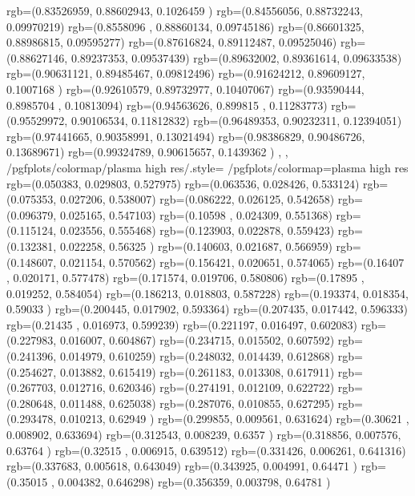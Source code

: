 {{{		  rgb=(0.83526959,  0.88602943,  0.1026459 )
		  rgb=(0.84556056,  0.88732243,  0.09970219)
		  rgb=(0.8558096 ,  0.88860134,  0.09745186)
		  rgb=(0.86601325,  0.88986815,  0.09595277)
		  rgb=(0.87616824,  0.89112487,  0.09525046)
		  rgb=(0.88627146,  0.89237353,  0.09537439)
		  rgb=(0.89632002,  0.89361614,  0.09633538)
		  rgb=(0.90631121,  0.89485467,  0.09812496)
		  rgb=(0.91624212,  0.89609127,  0.1007168 )
		  rgb=(0.92610579,  0.89732977,  0.10407067)
		  rgb=(0.93590444,  0.8985704 ,  0.10813094)
		  rgb=(0.94563626,  0.899815  ,  0.11283773)
		  rgb=(0.95529972,  0.90106534,  0.11812832)
		  rgb=(0.96489353,  0.90232311,  0.12394051)
		  rgb=(0.97441665,  0.90358991,  0.13021494)
		  rgb=(0.98386829,  0.90486726,  0.13689671)
		  rgb=(0.99324789,  0.90615657,  0.1439362 )
		},
	},
	/pgfplots/colormap/plasma high res/.style={%
		/pgfplots/colormap={plasma high res}{%
		  rgb=(0.050383,  0.029803,  0.527975)
		  rgb=(0.063536,  0.028426,  0.533124)
		  rgb=(0.075353,  0.027206,  0.538007)
		  rgb=(0.086222,  0.026125,  0.542658)
		  rgb=(0.096379,  0.025165,  0.547103)
		  rgb=(0.10598 ,  0.024309,  0.551368)
		  rgb=(0.115124,  0.023556,  0.555468)
		  rgb=(0.123903,  0.022878,  0.559423)
		  rgb=(0.132381,  0.022258,  0.56325 )
		  rgb=(0.140603,  0.021687,  0.566959)
		  rgb=(0.148607,  0.021154,  0.570562)
		  rgb=(0.156421,  0.020651,  0.574065)
		  rgb=(0.16407 ,  0.020171,  0.577478)
		  rgb=(0.171574,  0.019706,  0.580806)
		  rgb=(0.17895 ,  0.019252,  0.584054)
		  rgb=(0.186213,  0.018803,  0.587228)
		  rgb=(0.193374,  0.018354,  0.59033 )
		  rgb=(0.200445,  0.017902,  0.593364)
		  rgb=(0.207435,  0.017442,  0.596333)
		  rgb=(0.21435 ,  0.016973,  0.599239)
		  rgb=(0.221197,  0.016497,  0.602083)
		  rgb=(0.227983,  0.016007,  0.604867)
		  rgb=(0.234715,  0.015502,  0.607592)
		  rgb=(0.241396,  0.014979,  0.610259)
		  rgb=(0.248032,  0.014439,  0.612868)
		  rgb=(0.254627,  0.013882,  0.615419)
		  rgb=(0.261183,  0.013308,  0.617911)
		  rgb=(0.267703,  0.012716,  0.620346)
		  rgb=(0.274191,  0.012109,  0.622722)
		  rgb=(0.280648,  0.011488,  0.625038)
		  rgb=(0.287076,  0.010855,  0.627295)
		  rgb=(0.293478,  0.010213,  0.62949 )
		  rgb=(0.299855,  0.009561,  0.631624)
		  rgb=(0.30621 ,  0.008902,  0.633694)
		  rgb=(0.312543,  0.008239,  0.6357  )
		  rgb=(0.318856,  0.007576,  0.63764 )
		  rgb=(0.32515 ,  0.006915,  0.639512)
		  rgb=(0.331426,  0.006261,  0.641316)
		  rgb=(0.337683,  0.005618,  0.643049)
		  rgb=(0.343925,  0.004991,  0.64471 )
		  rgb=(0.35015 ,  0.004382,  0.646298)
		  rgb=(0.356359,  0.003798,  0.64781 )
}}}
